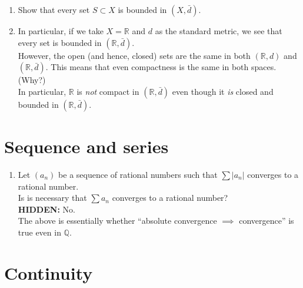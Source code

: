 \documentclass[12pt]{article}
\theoremstyle{definition}
\numberwithin{thm}{section}
\newcommand{\hint}[1]{\textbf{HIDDEN:} {\color[rgb]{0.95, 0.95, 0.95}#1}}
\begin{document}
\begin{enumerate}
\begin{enumerate}
		\item Show that every set $S \subset X$ is bounded in $(X, \bar{d}).$
		\item In particular, if we take $X = \mathbb{R}$ and $d$ as the standard metric, we see that every set is bounded in $(\mathbb{R}, \bar{d}).$\\
		However, the open (and hence, closed) sets are the same in both $(\mathbb{R}, d)$ and $(\mathbb{R}, \bar{d}).$ This means that even compactness is the same in both spaces. (Why?)\\
		In particular, $\mathbb{R}$ is \emph{not} compact in $(\mathbb{R}, \bar{d})$ even though it \emph{is} closed and bounded in $(\mathbb{R}, \bar{d}).$
	\end{enumerate}
\end{enumerate}
\newpage\section{Sequence and series}
\begin{enumerate}
	\item Let $(a_n)$ be a sequence of rational numbers such that $\sum |a_n|$ converges to a rational number.\\
	Is is necessary that $\sum a_n$ converges to a rational number?\\
	\hint{No.}\\
	The above is essentially whether ``absolute convergence $\implies$ convergence'' is true even in $\mathbb{Q}.$
\end{enumerate}
\newpage\section{Continuity}
\end{document}
